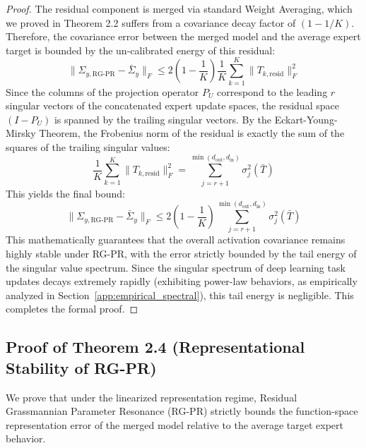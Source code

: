 \documentclass{article}
\theoremstyle{plain}
\theoremstyle{definition}
\theoremstyle{remark}
\begin{document}
\begin{proof}
The residual component is merged via standard Weight Averaging, which we proved in Theorem 2.2 suffers from a covariance decay factor of $(1 - 1/K)$. Therefore, the covariance error between the merged model and the average expert target is bounded by the un-calibrated energy of this residual:
\begin{equation}
\| \Sigma_{y, \text{RG-PR}} - \bar{\Sigma}_y \|_F \le 2 \left( 1 - \frac{1}{K} \right) \frac{1}{K} \sum_{k=1}^K \| T_{k, \text{resid}} \|_F^2
\end{equation}
Since the columns of the projection operator $P_U$ correspond to the leading $r$ singular vectors of the concatenated expert update spaces, the residual space $(I - P_U)$ is spanned by the trailing singular vectors. By the Eckart-Young-Mirsky Theorem, the Frobenius norm of the residual is exactly the sum of the squares of the trailing singular values:
\begin{equation}
\frac{1}{K} \sum_{k=1}^K \| T_{k, \text{resid}} \|_F^2 = \sum_{j=r+1}^{\min(d_{\text{out}}, d_{\text{in}})} \sigma_j^2(\bar{T})
\end{equation}
This yields the final bound:
\begin{equation}
\| \Sigma_{y, \text{RG-PR}} - \bar{\Sigma}_y \|_F \le 2 \left( 1 - \frac{1}{K} \right) \sum_{j=r+1}^{\min(d_{\text{out}}, d_{\text{in}})} \sigma_j^2(\bar{T})
\end{equation}
This mathematically guarantees that the overall activation covariance remains highly stable under RG-PR, with the error strictly bounded by the tail energy of the singular value spectrum. Since the singular spectrum of deep learning task updates decays extremely rapidly (exhibiting power-law behaviors, as empirically analyzed in Section~\ref{app:empirical_spectral}), this tail energy is negligible. This completes the formal proof.
\end{proof}

\subsection{Proof of Theorem 2.4 (Representational Stability of RG-PR)}
\label{app:proof_theorem_2_4}

We prove that under the linearized representation regime, Residual Grassmannian Parameter Resonance (RG-PR) strictly bounds the function-space representation error of the merged model relative to the average target expert behavior.
\end{document}
